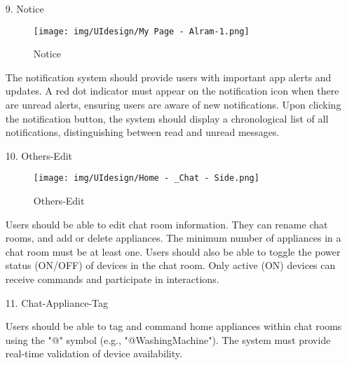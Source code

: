 \documentclass[conference]{IEEEtran}
\begin{document}
\begin{enumerate}
\begin{itemize}
\begin{itemize}
\begin{enumerate}
\begin{enumerate}
    \item[9.] Notice
    \begin{figure}[h]
        {\centering
        \hspace{4cm}
        \begin{minipage}{0.4\columnwidth}
            \texttt{[image: img/UIdesign/My Page - Alram-1.png]}
            \caption{Notice}
        \end{minipage}}
    \end{figure}
    
    The notification system should provide users with important app alerts and updates. A red dot indicator must appear on the notification icon when there are unread alerts, ensuring users are aware of new notifications. Upon clicking the notification button, the system should display a chronological list of all notifications, distinguishing between read and unread messages.\\
\end{enumerate}

\begin{enumerate}
    \item[10.] Others-Edit
    \begin{figure}[h]
        {\centering
        \hspace{4cm}
        \begin{minipage}{0.4\columnwidth}
            \texttt{[image: img/UIdesign/Home - \_Chat - Side.png]}
            \caption{Others-Edit}
        \end{minipage}}
    \end{figure}
    
    Users should be able to edit chat room information. They can rename chat rooms, and add or delete appliances. The minimum number of appliances in a chat room must be at least one. Users should also be able to toggle the power status (ON/OFF) of devices in the chat room. Only active (ON) devices can receive commands and participate in interactions. \\
\end{enumerate}

\begin{enumerate}
    \item[11.] Chat-Appliance-Tag
    
    Users should be able to tag and command home appliances within chat rooms using the "@" symbol (e.g., "@WashingMachine"). The system must provide real-time validation of device availability. \\ \\ \\ \\ \\ \\ \\
\end{enumerate}


\end{enumerate}
\end{itemize}
\end{itemize}
\end{enumerate}
\end{document}
